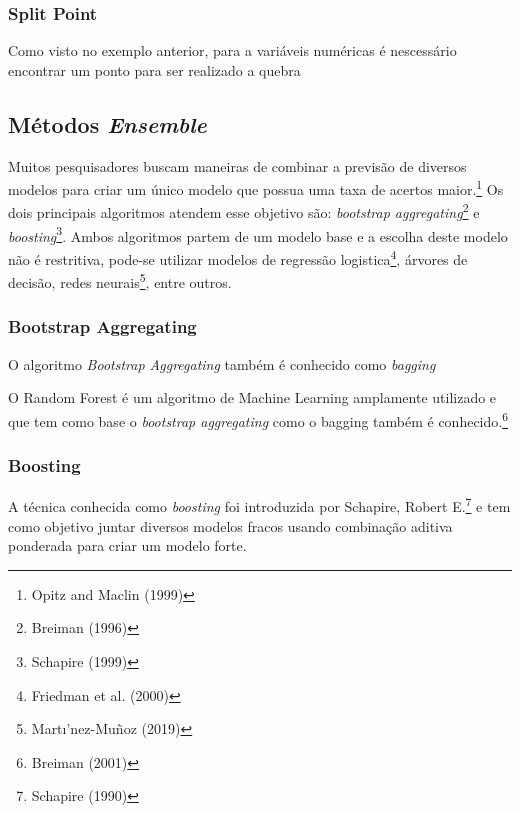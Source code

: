 \documentclass[
	12pt,				%
	a4paper,		%
	oneside,    %
	chapter=TITLE,		   %
	section=TITLE,		   %
	subsection=TITLE,	   %
	subsubsection=TITLE, %
	english,			%
	french,				%
	spanish,			%
	brazil,				%
]{abntex2}
\begin{document}
\hypertarget{section}{%
\paragraph{}\label{section}}

\hypertarget{split-point}{%
\subsubsection{Split Point}\label{split-point}}

Como visto no exemplo anterior, para a variáveis numéricas é nescessário
encontrar um ponto para ser realizado a quebra

\hypertarget{muxe9todos-ensemble}{%
\subsection{\texorpdfstring{Métodos
\emph{Ensemble}}{Métodos Ensemble}}\label{muxe9todos-ensemble}}

Muitos pesquisadores buscam maneiras de combinar a previsão de diversos
modelos para criar um único modelo que possua uma taxa de acertos
maior.\footnote{Opitz and Maclin (1999)} Os dois principais algoritmos
atendem esse objetivo são: \emph{bootstrap aggregating}\footnote{Breiman
  (1996)} e \emph{boosting}\footnote{Schapire (1999)}. Ambos algoritmos
partem de um modelo base e a escolha deste modelo não é restritiva,
pode-se utilizar modelos de regressão logistica\footnote{Friedman et al.
  (2000)}, árvores de decisão, redes neurais\footnote{Martı'nez-Muñoz
  (2019)}, entre outros.

\hypertarget{bootstrap-aggregating}{%
\subsubsection{Bootstrap Aggregating}\label{bootstrap-aggregating}}

O algoritmo \emph{Bootstrap Aggregating} também é conhecido como
\emph{bagging}

O Random Forest é um algoritmo de Machine Learning amplamente utilizado
e que tem como base o \emph{bootstrap aggregating} como o bagging também
é conhecido.\footnote{Breiman (2001)}

\hypertarget{boosting}{%
\subsubsection{Boosting}\label{boosting}}

A técnica conhecida como \emph{boosting} foi introduzida por Schapire,
Robert E.\footnote{Schapire (1990)} e tem como objetivo juntar diversos
modelos fracos usando combinação aditiva ponderada para criar um modelo
forte.
\end{document}
